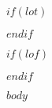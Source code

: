 \documentclass[ms]{uncgdissertationexp}
\theoremstyle{plain}
\theoremstyle{definition}
\theoremstyle{remark}
\begin{document}
\tableofcontents


  $if(lot)$
\listoftables
  $endif$



$if(lof)$
\listoffigures
$endif$


\mainmatter %
 
$body$






\end{document}
